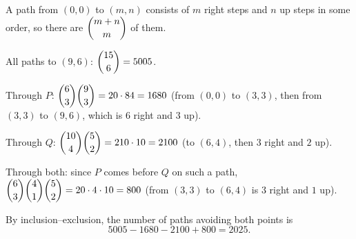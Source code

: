 A path from $(0,0)$ to $(m,n)$ consists of $m$ right steps and $n$ up steps in some order, so there are $\dbinom{m+n}{m}$ of them.

All paths to $(9,6)$: $\dbinom{15}{6}=5005$.

Through $P$: $\dbinom{6}{3}\dbinom{9}{3}=20\cdot 84=1680$ (from $(0,0)$ to $(3,3)$, then from $(3,3)$ to $(9,6)$, which is $6$ right and $3$ up).

Through $Q$: $\dbinom{10}{4}\dbinom{5}{2}=210\cdot 10=2100$ (to $(6,4)$, then $3$ right and $2$ up).

Through both: since $P$ comes before $Q$ on such a path, $\dbinom63\dbinom41\dbinom52=20\cdot4\cdot10=800$ (from $(3,3)$ to $(6,4)$ is $3$ right and $1$ up).

By inclusion--exclusion, the number of paths avoiding both points is
\[5005-1680-2100+800=\boxed{2025}.\]
